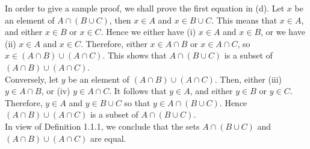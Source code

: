 In order to give a sample proof, we shall prove the first equation in (d).
Let $x$ be an element of $A\cap (B\cup C)$, then $x\in A$ and $x\in
B\cup C$.  This means that $x\in A$, and either $x\in B$ or $x\in C$.
Hence we either have (i) $x\in A$ and $x\in B$, or we have (ii) $x\in A$ and
$x\in C$. Therefore, either $x\in A\cap B$ or $x\in A\cap C$, so $x\in
(A\cap B) \cup (A\cap C)$.  This shows that $A\cap (B\cup C)$ is a
subset of $(A\cap
B)\cup (A\cap C)$.\\

Conversely, let $y$ be an element of $(A\cap B)\cup (A\cap C)$. Then,
either (iii) $y\in A\cap B$, or (iv) $y\in A\cap C$.  It follows that
$y\in A$, and either $y\in B$ or $y\in C$. Therefore, $y\in A$ and $y\in
B\cup C$ so that $y\in A \cap (B\cup C)$. Hence $(A\cap B) \cup
(A\cap C)$ is a subset of
$A\cap (B\cup C)$.\\

In view of Definition 1.1.1, we conclude that the sets $A\cap (B\cup C)$
and $(A \cap B) \cup (A\cap C)$ are equal.  
